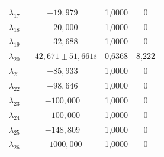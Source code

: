 \begin{longtable}{>{\centering\arraybackslash}m{1.5cm} c c c}
	$\lambda_{17}$ & $-19{,}979$                     & 1,0000 & 0 \\
	$\lambda_{18}$ & $-20{,}000$                     & 1,0000 & 0 \\
	$\lambda_{19}$ & $-32{,}688$                     & 1,0000 & 0 \\
	$\lambda_{20}$ & $-42{,}671 \pm 51{,}661i$       & 0,6368 & 8,222 \\
	$\lambda_{21}$ & $-85{,}933$                     & 1,0000 & 0 \\
	$\lambda_{22}$ & $-98{,}646$                     & 1,0000 & 0 \\
	$\lambda_{23}$ & $-100{,}000$                    & 1,0000 & 0 \\
	$\lambda_{24}$ & $-100{,}000$                    & 1,0000 & 0 \\
	$\lambda_{25}$ & $-148{,}809$                    & 1,0000 & 0 \\
	$\lambda_{26}$ & $-1000{,}000$                   & 1,0000 & 0 \\
\end{longtable}
\par
\endgroup

